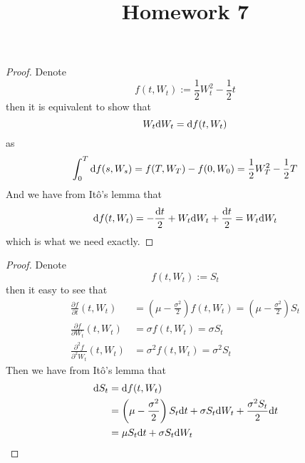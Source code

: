 \documentclass{homework}
\title{Homework 7}
\begin{document}
    \maketitle

    \problem
    \begin{proof}
        Denote
        \[f(t,W_t):=\frac{1}{2}W_t^2-\frac{1}{2}t\]
        then it is equivalent to show that
        \[W_t\mathrm d W_t=\mathrm d f(t,W_t)\]
        as
        \[\int_0^T\mathrm d f(s,W_s)=f(T,W_T)-f(0,W_0)=
        \frac{1}{2}W_T^2-\frac{1}{2}T\]
        And we have from It\^o's lemma that
        \[\mathrm d f(t,W_t)=-\frac{\mathrm d t}{2}+W_t\mathrm d W_t
        +\frac{\mathrm d t}{2}=W_t\mathrm d W_t\]
        which is what we need exactly.
    \end{proof}

    \problem
    \begin{proof}
        Denote
        \[f(t,W_t):=S_t\]
        then it easy to see that
        \[\begin{aligned}
            \frac{\partial f}{\partial t}(t,W_t)
            &=\left(\mu-\frac{\sigma^2}{2}\right)f(t,W_t)
            =\left(\mu-\frac{\sigma^2}{2}\right)S_t\\
            \frac{\partial f}{\partial W_t}(t,W_t)
            &=\sigma f(t,W_t)=\sigma S_t\\
            \frac{\partial^2 f}{\partial^2 W_t}(t,W_t)
            &=\sigma^2 f(t,W_t)=\sigma^2 S_t
        \end{aligned}\]
        Then we have from It\^o's lemma that
        \[\begin{aligned}
            \mathrm d S_t&=\mathrm d f(t,W_t)\\
            &=\left(\mu-\frac{\sigma^2}{2}\right)S_t\mathrm d t
            +\sigma S_t\mathrm d W_t+\frac{\sigma^2 S_t}{2}\mathrm d t\\
            &=\mu S_t\mathrm d t+\sigma S_t\mathrm d W_t
        \end{aligned}\]
    \end{proof}
\end{document}
